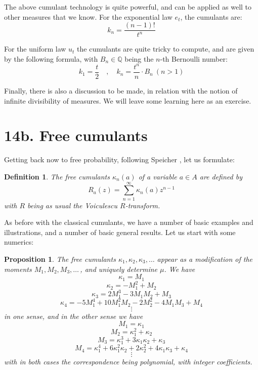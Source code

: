 \documentclass[12pt]{amsbook}
\newtheorem{definition}[theorem]{Definition}
\newtheorem{proposition}[theorem]{Proposition}
\begin{document}
The above cumulant technology is quite powerful, and can be applied as well to other measures that we know. For the exponential law $e_t$, the cumulants are:
$$k_n=\frac{(n-1)!}{t^n}$$

For the uniform law $u_t$ the cumulants are quite tricky to compute, and are given by the following formula, with $B_n\in\mathbb Q$ being the $n$-th Bernoulli number:
$$k_1=\frac{t}{2}\quad,\quad k_n=\frac{t^n}{n}\cdot B_n\ (n>1)$$

Finally, there is also a discussion to be made, in relation with the notion of infinite divisibility of measures. We will leave some learning here as an exercise.

\section*{14b. Free cumulants}

Getting back now to free probability, following Speicher \cite{sp1}, let us formulate:


\begin{definition}
The free cumulants $\kappa_n(a)$ of a variable $a\in A$ are defined by
$$R_a(z)=\sum_{n=1}^\infty\kappa_n(a)z^{n-1}$$
with $R$ being as usual the Voiculescu $R$-transform.
\end{definition}

As before with the classical cumulants, we have a number of basic examples and illustrations, and a number of basic general results. Let us start with some numerics:

\begin{proposition}
The free cumulants $\kappa_1,\kappa_2,\kappa_3,\ldots$ appear as a modification of the moments $M_1,M_2,M_3,\ldots\,$, and uniquely determine $\mu$. We have
$$\kappa_1=M_1$$
$$\kappa_2=-M_1^2+M_2$$
$$\kappa_3=2M_1^3-3M_1M_2+M_3$$
$$\kappa_4=-5M_1^4+10M_1^2M_2-2M_2^2-4M_1M_3+M_4$$
$$\vdots$$
in one sense, and in the other sense we have
$$M_1=\kappa_1$$
$$M_2=\kappa_1^2+\kappa_2$$
$$M_3=\kappa_1^3+3\kappa_1\kappa_2+\kappa_3$$
$$M_4=\kappa_1^4+6\kappa_1^2\kappa_2+2\kappa_2^2+4\kappa_1\kappa_3+\kappa_4$$
$$\vdots$$
with in both cases the correspondence being polynomial, with integer coefficients.
\end{proposition}
\end{document}
